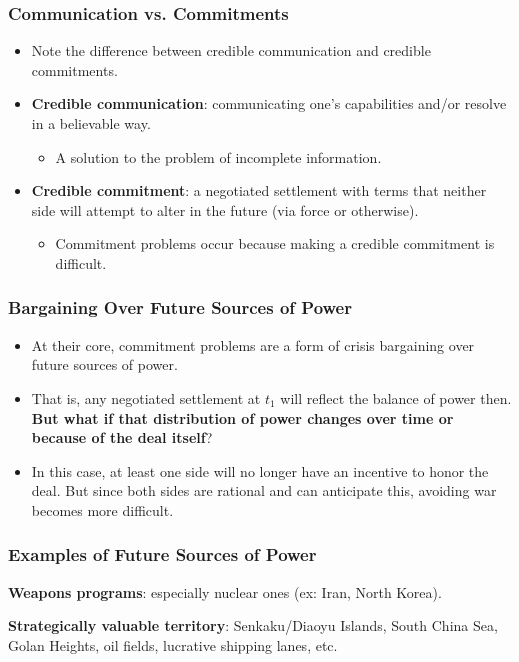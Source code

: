 \documentclass{beamer}
\begin{document}
\begin{frame} 
	\frametitle{\LARGE{Communication vs. Commitments}}
	\begin{itemize}
		\item Note the difference between credible communication and credible commitments. \pause
		\item \textbf{Credible communication}: communicating one's capabilities and/or resolve in a believable way.  
		\begin{itemize}
			\item A solution to the problem of incomplete information. \pause
		\end{itemize}
		\item \textbf{Credible commitment}: a negotiated settlement with terms that neither side will attempt to alter in the future (via force or otherwise). \pause
		\begin{itemize}
			\item Commitment problems occur because making a credible commitment is difficult.
		\end{itemize}
	\end{itemize}
\end{frame}

\begin{frame} 
	\frametitle{\LARGE{Bargaining Over Future Sources of Power}}
	\begin{itemize}
		\item At their core, commitment problems are a form of crisis bargaining over future sources of power. \pause
		\item That is, any negotiated settlement at $t_1$ will reflect the balance of power then. \textbf{But what if that distribution of power changes over time or because of the deal itself}? \pause
		\item In this case, at least one side will no longer have an incentive to honor the deal. But since both sides are rational and can anticipate this, avoiding war becomes more difficult.	
	\end{itemize}
\end{frame}

\begin{frame} 
	\frametitle{\LARGE{Examples of Future Sources of Power}}
	\begin{itemize}
		\Large{
			\item \textbf{Weapons programs}: especially nuclear ones (ex: Iran, North Korea).
			\item\textbf{Strategically valuable territory}: Senkaku/Diaoyu Islands, South China Sea, Golan Heights, oil fields, lucrative shipping lanes, etc.
		}
	\end{itemize}
\end{frame}
\end{document}
